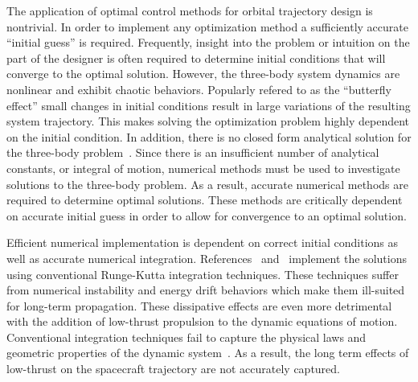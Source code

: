 \documentclass[preprint]{elsarticle}
\begin{document}
The application of optimal control methods for orbital trajectory design is nontrivial.
In order to implement any optimization method a sufficiently accurate ``initial guess'' is required.
Frequently, insight into the problem or intuition on the part of the designer is often required to determine initial conditions that will converge to the optimal solution.
However, the three-body system dynamics are nonlinear and exhibit chaotic behaviors. 
Popularly refered to as the ``butterfly effect'' small changes in initial conditions result in large variations of the resulting system trajectory. 
This makes solving the optimization problem highly dependent on the initial condition.
In addition, there is no closed form analytical solution for the three-body problem~\cite{szebehely1967}.
Since there is an insufficient number of analytical constants, or integral of motion, numerical methods must be used to investigate solutions to the three-body problem.
As a result, accurate numerical methods are required to determine optimal solutions.
These methods are critically dependent on accurate initial guess in order to allow for convergence to an optimal solution.


Efficient numerical implementation is dependent on correct initial conditions as well as accurate numerical integration.
References~ and~ implement the solutions using conventional Runge-Kutta integration techniques.
These techniques suffer from numerical instability and energy drift behaviors which make them ill-suited for long-term propagation.
These dissipative effects are even more detrimental with the addition of low-thrust propulsion to the dynamic equations of motion.
Conventional integration techniques fail to capture the physical laws and geometric properties of the dynamic system~\cite{hairer2006}.
As a result, the long term effects of low-thrust on the spacecraft trajectory are not accurately captured. 
\end{document}
